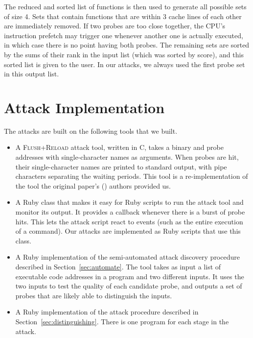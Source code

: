 \documentclass[letterpaper,twocolumn,10pt]{article}
\begin{document}

The reduced and sorted list of functions is then used to generate all possible
sets of size 4. Sets that contain functions that are within 3 cache lines of
each other are immediately removed. If two probes are too close together, the
CPU's instruction prefetch may trigger one whenever another
one is actually executed, in which case there is no point having both probes.
The remaining sets are sorted by the sums of their rank in the input list (which
was sorted by score), and this sorted list is given to the user.
In our attacks, we always used the first probe set in this output list.

\section{Attack Implementation}
\label{sec:implementation}

The attacks are built on the following tools that we built.

\begin{itemize}
    \item A \textsc{Flush+Reload} attack tool, written in C, takes a binary and probe
        addresses with single-character names as arguments. When probes are hit,
        their single-character names are printed to standard output, with pipe
        characters separating the waiting periods. This tool is
        a re-implementation of the tool the original paper's
        (\cite{yarom2013flush}) authors provided us.

    \item A Ruby class that makes it easy for Ruby scripts to run the attack
        tool and monitor its output. It provides a callback whenever there is
        a burst of probe hits. This lets the attack script react to events (such
        as the entire execution of a command). Our attacks are implemented as
        Ruby scripts that use this class.

    \item A Ruby implementation of the semi-automated attack discovery procedure
        described in Section~\ref{sec:automate}. The tool takes as input a list
        of executable code addresses in a program and two different inputs. It
        uses the two inputs to test the quality of each candidate probe, and
        outputs a set of probes that are likely able to distinguish the inputs.

    \item A Ruby implementation of the attack procedure described in
          Section~\ref{sec:distinguishing}. There is one program for each stage
          in the attack.
\end{itemize}
\end{document}
